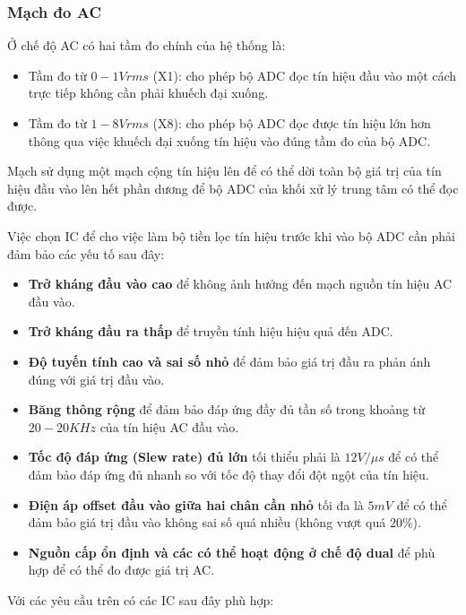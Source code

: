 	\subsubsection{Mạch đo AC}
	
	Ở chế độ AC có hai tầm đo chính của hệ thống là:
	
	\begin{itemize}[label=-]
		\item Tầm đo từ $0 - 1Vrms$ (X1): cho phép bộ ADC đọc tín hiệu đầu vào một cách trực tiếp không cần phải khuếch đại xuống.
		\item Tầm đo từ $1 - 8Vrms$ (X8): cho phép bộ ADC đọc được tín hiệu lớn hơn thông qua việc khuếch đại xuống tín hiệu vào đúng tầm đo của bộ ADC.
	\end{itemize}
	
	Mạch sử dụng một mạch cộng tín hiệu lên để có thể dời toàn bộ giá trị của tín hiệu đầu vào lên hết phần dương để bộ ADC của khối xử lý trung tâm có thể đọc được.
	
	Việc chọn IC để cho việc làm bộ tiền lọc tín hiệu trước khi vào bộ ADC cần phải đảm bảo các yếu tố sau đây:
	
	\begin{itemize}[label=-]
		\item \textbf{Trở kháng đầu vào cao} để không ảnh hưởng đến mạch nguồn tín hiệu AC đầu vào.
		\item \textbf{Trở kháng đầu ra thấp} để truyền tính hiệu hiệu quả đến ADC.
		\item \textbf{Độ tuyến tính cao và sai số nhỏ} để đảm bảo giá trị đầu ra phản ánh đúng với giá trị đầu vào.
		\item \textbf{Băng thông rộng} để đảm bảo đáp ứng đầy đủ tần số trong khoảng từ $20 - 20KHz$ của tín hiệu AC đầu vào.
		\item \textbf{Tốc độ đáp ứng (Slew rate) đủ lớn} tối thiểu phải là $12V/ \mu s$ để có thể đảm bảo đáp ứng đủ nhanh so với tốc độ thay đổi đột ngột của tín hiệu.
		\item \textbf{Điện áp offset đầu vào giữa hai chân cần nhỏ} tối đa là $5mV$ để có thể đảm bảo giá trị đầu vào không sai số quá nhiều (không vượt quá $20\%$).
		\item \textbf{Nguồn cấp ổn định và các có thể hoạt động ở chế độ dual} để phù hợp để có thể đo được giá trị AC.
	\end{itemize}
	
	Với các yêu cầu trên có các IC sau đây phù hợp:
	

